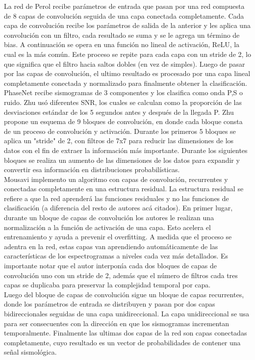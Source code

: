 \documentclass[../main.tex]{subfiles}
\begin{document}
La red de Perol recibe parámetros de entrada que pasan por una red compuesta de 8 capas de convolución seguida de una capa conectada completamente. Cada capa de convolución recibe los parámetros de salida de la anterior y les aplica una convolución con un filtro, cada resultado se suma y se le agrega un término de bias. A continuación se opera en una función no lineal de activación, ReLU, la cual es la más común. Este proceso se repite para cada capa con un stride de 2, lo que significa que el filtro hacia saltos dobles (en vez de simples). Luego de pasar por las capas de convolución, el ultimo resultado es procesado por una capa lineal completamente conectada y normalizado para finalmente obtener la clasificación. \\

PhaseNet recibe sismogramas de 3 componentes y los clasifica como onda P,S o ruido. Zhu usó diferentes SNR, los cuales se calculan como la proporción de las desviaciones estándar de los 5 segundos antes y después de la llegada P. Zhu propone un esquema de 9 bloques de convolución, en donde cada bloque consta de un proceso de convolución y activación. Durante los primeros 5 bloques se aplica un "stride" de 2, con filtros de 7x7 para reducir las dimensiones de los datos con el fin de extraer la información más importante. Durante los siguientes bloques se realiza un aumento de las dimensiones de los datos para expandir y convertir esa información en distribuciones probabilísticas. \\

Mousavi implemento un algoritmo con capas de convolución, recurrentes y conectadas completamente en una estructura residual. La estructura residual se refiere a que la red aprenderá las funciones residuales y no las funciones de clasificación (a diferencia del resto de autores acá citados). En primer lugar, durante un bloque de capas de convolución los autores le realizan una normalización a la función de activación de una capa. Esto acelera el entrenamiento y ayuda a prevenir el overfitting. A medida que el proceso se adentra en la red, estas capas van aprendiendo automáticamente de las características de los espectrogramas a niveles cada vez más detallados. Es importante notar que el autor interponía cada dos bloques de capas de convolución uno con un stride de 2, además que el número de filtros cada tres capas se duplicaba para preservar la complejidad temporal por capa.\\

Luego del bloque de capas de convolución sigue un bloque de capas recurrentes, donde los parámetros de entrada se distribuyen y pasan por dos capas bidireccionales seguidas de una capa unidireccional. La capa unidireccional se usa para ser consecuentes con la dirección en que los sismogramas incrementan temporalmente. Finalmente las ultimas dos capas de la red son capas conectadas completamente, cuyo resultado es un vector de probabilidades de contener una señal sismológica.\\
\end{document}
